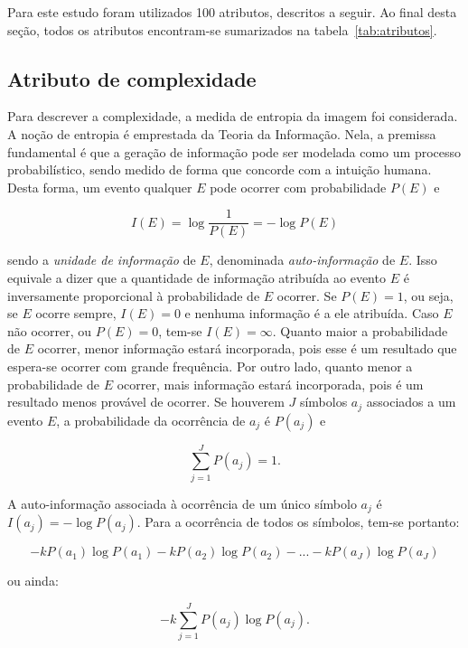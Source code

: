 Para este estudo foram utilizados 100 atributos, descritos a seguir. Ao
final desta seção, todos os atributos encontram-se sumarizados na
tabela~\ref{tab:atributos}.

\subsection{Atributo de complexidade}

Para descrever a complexidade, a medida de entropia da imagem foi
considerada. A noção de entropia é emprestada da Teoria da
Informação. Nela, a premissa fundamental é que a geração de informação
pode ser modelada como um processo probabilístico, sendo medido de
forma que concorde com a intuição humana.~\cite{gonzalez} Desta forma,
um evento qualquer $E$ pode ocorrer com probabilidade $P(E)$ e

\begin{equation}
  I(E) = \log\frac{1}{P(E)} = -\log P(E)
\end{equation}

\noindent sendo a \emph{unidade de informação} de $E$, denominada
\emph{auto-informação} de $E$. Isso equivale a dizer que a quantidade
de informação atribuída ao evento $E$ é inversamente proporcional à
probabilidade de $E$ ocorrer. Se $P(E) = 1$, ou seja, se $E$ ocorre
sempre, $I(E) = 0$ e nenhuma informação é a ele atribuída. Caso $E$
não ocorrer, ou $P(E) = 0$, tem-se $I(E) = \infty$. Quanto maior a
probabilidade de $E$ ocorrer, menor informação estará incorporada,
pois esse é um resultado que espera-se ocorrer com grande
frequência. Por outro lado, quanto menor a probabilidade de $E$
ocorrer, mais informação estará incorporada, pois é um resultado menos
provável de ocorrer. Se houverem $J$ símbolos $a_j$ associados a um
evento $E$, a probabilidade da ocorrência de $a_j$ é $P(a_j)$ e

\begin{equation}
  \sum_{j=1}^J P(a_j) = 1.
\end{equation}

\noindent A auto-informação associada à ocorrência de um único símbolo
$a_j$ é $I(a_j) = -\log P(a_j)$. Para a ocorrência de todos os
símbolos, tem-se portanto:

\begin{equation}
  -kP(a_1) \log P(a_1) -kP(a_2) \log P(a_2) -...-kP(a_J) \log P(a_J)
\end{equation}

\noindent ou ainda:

\begin{equation}
  -k \sum_{j=1}^J P(a_j) \log P(a_j).
\end{equation}

